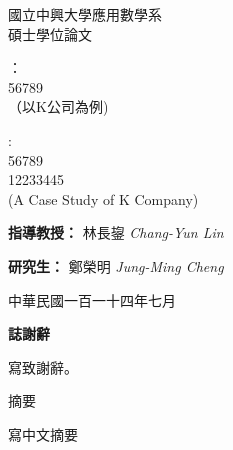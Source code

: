 \documentclass{ctexart}
\begin{document}
\begin{titlepage}
    \centering
    {\fontsize{18}{22}\selectfont 國立中興大學應用數學系\\[0.5cm] 碩士學位論文 \par}
    \vspace{4cm} %
    {\fontsize{18}{22}：\\56789\\（以K公司為例)\par}
    \vspace{0.5cm} %
    {\fontsize{18}{22}:\\ 56789 \\ 12233445\\ (A Case Study of K Company)\par}
    \vspace{5cm} %
    {\fontsize{18}{22}\selectfont \textbf{指導教授：} 林長鋆 \textit{Chang-Yun Lin} \par}  
    \vspace{0.5cm}
    {\fontsize{18}{22}\selectfont \textbf{研究生：} 鄭榮明 \textit{Jung-Ming Cheng} \par}
    \vfill
    {\fontsize{18}{22}\selectfont 中華民國一百一十四年七月 \par}
\end{titlepage}

\onehalfspacing %

\clearpage
\thispagestyle{empty} %
\begin{center}
    \Large \textbf{誌謝辭}
\end{center}
\vspace{0.5cm}
\noindent
\par
\begin{onehalfspacing}
寫致謝辭。
\end{onehalfspacing}

\newpage

\begin{center}
{\fontsize{20}{24}\selectfont 摘要} %
\setcounter{page}{1} %
\end{center}
\vspace{0.5cm} %
\noindent %
\par
\begin{onehalfspacing}
寫中文摘要\par
\end{onehalfspacing}
\end{document}
